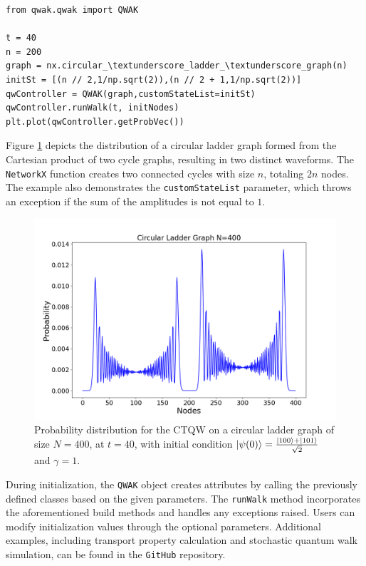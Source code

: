 \documentclass[main.tex]{subfiles}
\begin{document}
\begin{lstlisting}[style=code,escapeinside={__}]
from qwak.qwak import QWAK

t = 40
n = 200
graph = nx.circular_\textunderscore_ladder_\textunderscore_graph(n)
initSt = [(n // 2,1/np.sqrt(2)),(n // 2 + 1,1/np.sqrt(2))]
qwController = QWAK(graph,customStateList=initSt)
qwController.runWalk(t, initNodes)
plt.plot(qwController.getProbVec())
\end{lstlisting}

Figure \ref{fig:probDistCircLadder} depicts the distribution of a circular
ladder graph formed from the Cartesian product of two cycle graphs, resulting
in two distinct waveforms. The \texttt{NetworkX} function creates two connected
cycles with size $n$, totaling $2n$ nodes. The example also demonstrates the
\texttt{customStateList} parameter, which throws an exception if the sum of the
amplitudes is not equal to $1$.\par

\begin{figure}[!h]
\centering
\includegraphics[scale=\mysinglefigurescale]{img/QWAK/UndirectedDynamics/circularLadderDynamics_N400_TMAX40.png}
\caption{Probability distribution for the CTQW on a
circular ladder graph of size $N=400$, at $t=40$, with initial condition
$\ket{\psi(0)}=\frac{\ket{100}+\ket{101}}{\sqrt{2}}$ and $\gamma=1$.}
\label{fig:probDistCircLadder}
\end{figure}

During initialization, the \texttt{QWAK} object creates attributes by calling
the previously defined classes based on the given parameters. The
\texttt{runWalk} method incorporates the aforementioned build methods and
handles any exceptions raised. Users can modify initialization values through
the optional parameters. Additional examples, including transport property
calculation and stochastic quantum walk simulation, can be found in the
\texttt{GitHub} repository.
\end{document}
